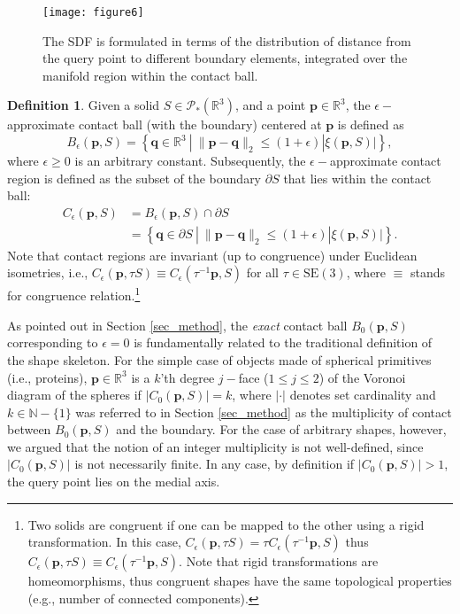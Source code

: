 \documentclass[article]{gmp2014}
\theoremstyle{definition}
\newtheorem{defn}{\textsf{\textbf{{Definition}}}}
\begin{document}
%
\begin{figure}
    \centering
    \texttt{[image: figure6]}
    \caption{The SDF is formulated in terms of the distribution of distance from the query point to different boundary elements, integrated over the manifold region within the contact ball.} \label{figure6}
\end{figure}
%

%
\begin{defn}
    Given a solid $S \in \mathcal{P}_\ast(\mathds{R}^3)$, and a point $\mathbf{p} \in \mathds{R}^3$, the $\epsilon-$approximate contact ball (with the boundary) centered at $\mathbf{p}$ is defined as
    \begin{equation}
        B_\epsilon(\mathbf{p}, S) = \left\{ \mathbf{q} \in \mathds{R}^3 ~|~ \| \mathbf{p} - \mathbf{q} \|_2 \leq (1+\epsilon)|\xi(\mathbf{p}, S)| \right\}, \label{eq_form_10a}
    \end{equation}
    where $\epsilon \geq 0$ is an arbitrary constant. Subsequently, the $\epsilon-$approximate contact region is defined as the subset of the boundary $\partial S$ that lies within the contact ball:
    \begin{align}
        C_\epsilon(\mathbf{p}, S) &= B_\epsilon(\mathbf{p}, S) \cap \partial S \nonumber \\
        &= \left\{ \mathbf{q} \in \partial S ~|~ \| \mathbf{p} - \mathbf{q} \|_2 \leq (1+\epsilon)|\xi(\mathbf{p}, S)| \right\}. \label{eq_form_10b}
    \end{align}
    Note that contact regions are invariant (up to congruence) under Euclidean isometries, i.e., $C_\epsilon(\mathbf{p}, \tau S) \equiv C_\epsilon(\tau^{-1} \mathbf{p}, S)$ for all $\tau \in \mathrm{SE}(3)$, where $\equiv$ stands for congruence relation.\footnote{Two solids are congruent if one can be mapped to the other using a rigid transformation. In this case, $C_\epsilon(\mathbf{p}, \tau S) = \tau C_\epsilon(\tau^{-1} \mathbf{p}, S)$ thus $C_\epsilon(\mathbf{p}, \tau S) \equiv C_\epsilon(\tau^{-1} \mathbf{p}, S)$. Note that rigid transformations are homeomorphisms, thus congruent shapes have the same topological properties (e.g., number of connected components).}
\end{defn}
%
As pointed out in Section \ref{sec_method}, the {\it exact} contact ball $B_0(\mathbf{p}, S)$ corresponding to $\epsilon = 0$ is fundamentally related to the traditional definition of the shape skeleton. For the simple case of objects made of spherical primitives (i.e., proteins), $\mathbf{p} \in \mathds{R}^3$ is a $k$'th degree $j-$face ($1 \leq j \leq 2$) of the Voronoi diagram of the spheres if $|C_0(\mathbf{p}, S)| = k$, where $|\cdot|$ denotes set cardinality and $k \in \mathds{N} - \{1\}$ was referred to in Section \ref{sec_method} as the multiplicity of contact between $B_0(\mathbf{p}, S)$ and the boundary. For the case of arbitrary shapes, however, we argued that the notion of an integer multiplicity is not well-defined, since $|C_0(\mathbf{p}, S)|$ is not necessarily finite. In any case, by definition if $|C_0(\mathbf{p}, S)| > 1$, the query point lies on the medial axis.
\end{document}
